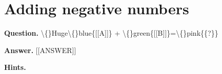 \documentclass{article}
\begin{document}
\section*{Adding negative numbers}
\textbf{Question.} \textbackslash\{\}Huge\textbackslash\{\}blue\{[[A]]\} + \textbackslash\{\}green\{[[B]]\}=\textbackslash\{\}pink\{\{?\}\}

\textbf{Answer.} [[ANSWER]]

\textbf{Hints.}
\begin{itemize}

\end{itemize}
\end{document}
